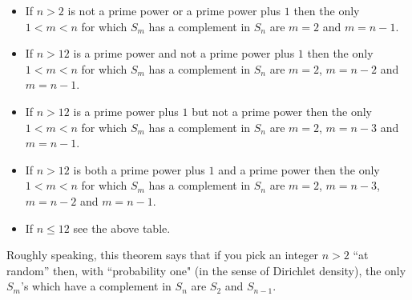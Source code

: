 \begin{theorem} 
\label{mainthrm}
\begin{itemize}

\item
If $n>2$ is not a prime power or
a prime power plus $1$ then the only $1<m<n$ for
which $S_m$ has a complement in $S_n$ are $m=2$
and $m=n-1$. 
\item
If $n>12$ is a prime power and not
a prime power plus $1$ then 
the only $1<m<n$ for which $S_m$ has a complement in 
$S_n$ are $m=2$, $m=n-2$ and $m=n-1$. 
\item
If $n>12$ is a prime power plus $1$ but not a prime power 
then the only $1<m<n$ for which $S_m$ has a complement in 
$S_n$ are $m=2$, $m=n-3$ and $m=n-1$. 
\item
If $n>12$ is both a prime power plus $1$ and a prime power 
then the only $1<m<n$ for which $S_m$ has a complement in 
$S_n$ are $m=2$, $m=n-3$, $m=n-2$ and $m=n-1$. 
\item
If $n\leq 12$ see the above table.
\end{itemize}
\end{theorem}

\begin{remark} Roughly speaking, this theorem says that if you 
pick an integer $n>2$ ``at random'' then, with
``probability one" (in the sense of Dirichlet
density), the only $S_m$'s
which have a complement in $S_n$ are $S_2$ and $S_{n-1}$.
\end{remark}

